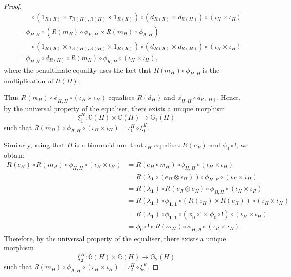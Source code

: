 \documentclass{amsart}
\begin{document}
\begin{proof}
\begin{align*}
&\qquad \circ (1_{R(H)} \times \tau_{R(H),R(H)} \times 1_{R(H)}) \circ (d_{R(H)} \times d_{R(H)}) \circ (\iota_H \times \iota_H) \\
&= \phi_{H,H} \circ (R(m_H) \circ \phi_{H,H} \times R(m_H) \circ \phi_{H,H}) \\
&\qquad \circ (1_{R(H)} \times \tau_{R(H),R(H)} \times 1_{R(H)}) \circ (d_{R(H)} \times d_{R(H)}) \circ (\iota_H \times \iota_H) \\
&= \phi_{H,H} \circ d_{R(H)} \circ R(m_H) \circ \phi_{H,H} \circ (\iota_H \times \iota_H),
\end{align*}
where the penultimate equality uses the fact that $R(m_H) \circ \phi_{H,H}$ is the multiplication of $\overline{R}(H)$.

Thus $R(m_H) \circ \phi_{H,H} \circ (\iota_H \times \iota_H)$ equalises $R(d_H)$ and $\phi_{H,H} \circ d_{R(H)}$. Hence, by the universal property of the equaliser, there exists a unique morphism
\[
\xi^H_1 \colon \mathbb{G}(H) \times \mathbb{G}(H) \longrightarrow \mathbb{G}_1(H)
\]
such that $R(m_H) \circ \phi_{H,H} \circ (\iota_H \times \iota_H) = \iota^H_1 \circ \xi^H_1$.

Similarly, using that $H$ is a bimonoid and that $\iota_H$ equalises $R(e_H)$ and $\phi_0 \circ !$, we obtain:
\begin{align*}
R(e_H) \circ R(m_H) \circ \phi_{H,H} \circ (\iota_H \times \iota_H)
&= R(e_H \circ m_H) \circ \phi_{H,H} \circ (\iota_H \times \iota_H) \\
&= R(\lambda_{\mathbf{1}} \circ (e_H \otimes e_H)) \circ \phi_{H,H} \circ (\iota_H \times \iota_H) \\
&= R(\lambda_{\mathbf{1}}) \circ R(e_H \otimes e_H) \circ \phi_{H,H} \circ (\iota_H \times \iota_H) \\
&= R(\lambda_{\mathbf{1}}) \circ \phi_{\mathbf{1}, \mathbf{1}} \circ (R(e_H) \times R(e_H)) \circ (\iota_H \times \iota_H) \\
&= R(\lambda_{\mathbf{1}}) \circ \phi_{\mathbf{1}, \mathbf{1}} \circ (\phi_0 \circ ! \times \phi_0 \circ !) \circ (\iota_H \times \iota_H) \\
&= \phi_0 \circ ! \circ R(m_H) \circ \phi_{H,H} \circ (\iota_H \times \iota_H).
\end{align*}
Therefore, by the universal property of the equaliser, there exists a unique morphism
\[
\xi^H_2 \colon \mathbb{G}(H) \times \mathbb{G}(H) \longrightarrow \mathbb{G}_2(H)
\]
such that $R(m_H) \circ \phi_{H,H} \circ (\iota_H \times \iota_H) = \iota^H_2 \circ \xi^H_2$.


\end{proof}
\end{document}
